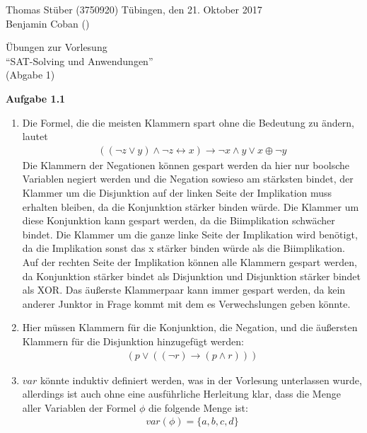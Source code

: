 \documentclass[a4paper,10pt]{article}
\title{}
\author{}
\begin{document}
\noindent Thomas Stüber (3750920) \hfill Tübingen, den  21. Oktober 2017\\
\noindent Benjamin Coban () \\
\begin{center}
\Large Übungen zur Vorlesung  \\ ``SAT-Solving und Anwendungen'' \\
\vspace*{2mm}
\large (Abgabe 1) \\
\vspace*{2mm}
\end{center}

\noindent\textbf{Aufgabe 1.1}\\
\begin{enumerate}
\item Die Formel, die die meisten Klammern spart ohne die Bedeutung zu ändern, lautet
\begin{align*}
((\neg z \vee y) \wedge \neg z \leftrightarrow x) \rightarrow \neg x \wedge y \vee x \oplus \neg y
\end{align*}
Die Klammern der Negationen können gespart werden da hier nur boolsche Variablen negiert werden und die Negation sowieso am stärksten bindet, der Klammer um die Disjunktion auf der linken Seite der Implikation muss erhalten bleiben, da die Konjunktion stärker binden würde. Die Klammer um diese Konjunktion kann gespart werden, da die Biimplikation schwächer bindet. Die Klammer um die ganze linke Seite der Implikation wird benötigt, da die Implikation sonst das x stärker binden würde als die Biimplikation. Auf der rechten Seite der Implikation können alle Klammern gespart werden, da Konjunktion stärker bindet als Disjunktion und Disjunktion stärker bindet als XOR. Das äußerste Klammerpaar kann immer gespart werden, da kein anderer Junktor in Frage kommt mit dem es Verwechslungen geben könnte. 

\item Hier müssen Klammern für die Konjunktion, die Negation, und die äußersten Klammern für die Disjunktion hinzugefügt werden:
\begin{align*}
(p \vee ((\neg r) \rightarrow (p \wedge r)))
\end{align*}

\item $var$ könnte induktiv definiert werden, was in der Vorlesung unterlassen wurde, allerdings ist auch ohne eine ausführliche Herleitung klar, dass die Menge aller Variablen der Formel $\phi$ die folgende Menge ist:
\begin{align*}
var(\phi) = \{a, b, c, d\}
\end{align*} 
\end{enumerate}
\end{document}
